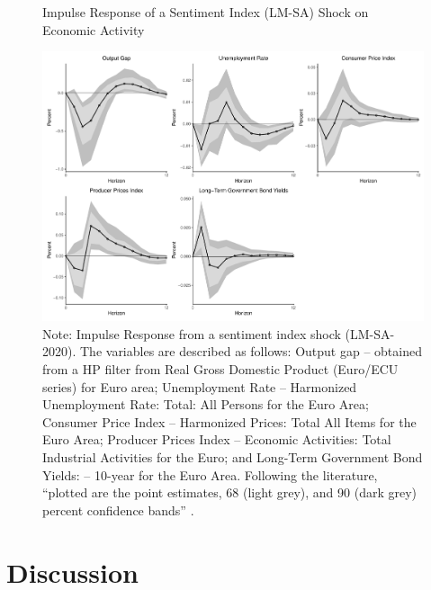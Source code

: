\begin{figure}[!h]
    \centering
    \caption{Impulse Response of a Sentiment Index (LM-SA) Shock on Economic Activity}
    \includegraphics[width=\textwidth]{images/irf_lm.pdf}
    \caption*{Note: Impulse Response from a sentiment index shock (LM-SA-2020). The variables are described as follows: Output gap -- obtained from a HP filter from Real Gross Domestic Product (Euro/ECU series) for Euro area; Unemployment Rate -- Harmonized Unemployment Rate: Total: All Persons for the Euro Area; Consumer Price Index -- Harmonized Prices: Total All Items for the Euro Area; Producer Prices Index -- Economic Activities: Total Industrial Activities for the Euro; and Long-Term Government Bond Yields: -- 10-year for the Euro Area. Following the literature, ``plotted are the point estimates, 68 (light grey), and 90 (dark grey) percent confidence bands'' \cite[p. 40]{shapiro2020measuring}.}
    \label{fig:irflm}
\end{figure}

\newpage

\section{Discussion}


